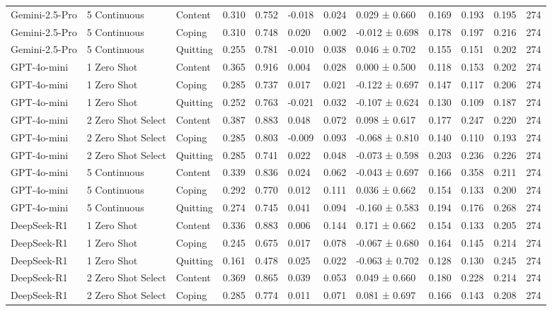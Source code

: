 \begin{tabular}{lllllllllllr}
Gemini-2.5-Pro & 5 Continuous & Content & 0.310 & 0.752 & -0.018 & 0.024 & 0.029 ± 0.660 & 0.169 & 0.193 & 0.195 & 274 \\
Gemini-2.5-Pro & 5 Continuous & Coping & 0.310 & 0.748 & 0.020 & 0.002 & -0.012 ± 0.698 & 0.178 & 0.197 & 0.216 & 274 \\
Gemini-2.5-Pro & 5 Continuous & Quitting & 0.255 & 0.781 & -0.010 & 0.038 & 0.046 ± 0.702 & 0.155 & 0.151 & 0.202 & 274 \\
GPT-4o-mini & 1 Zero Shot & Content & 0.365 & 0.916 & 0.004 & 0.028 & 0.000 ± 0.500 & 0.118 & 0.153 & 0.202 & 274 \\
GPT-4o-mini & 1 Zero Shot & Coping & 0.285 & 0.737 & 0.017 & 0.021 & -0.122 ± 0.697 & 0.147 & 0.117 & 0.206 & 274 \\
GPT-4o-mini & 1 Zero Shot & Quitting & 0.252 & 0.763 & -0.021 & 0.032 & -0.107 ± 0.624 & 0.130 & 0.109 & 0.187 & 274 \\
GPT-4o-mini & 2 Zero Shot Select & Content & 0.387 & 0.883 & 0.048 & 0.072 & 0.098 ± 0.617 & 0.177 & 0.247 & 0.220 & 274 \\
GPT-4o-mini & 2 Zero Shot Select & Coping & 0.285 & 0.803 & -0.009 & 0.093 & -0.068 ± 0.810 & 0.140 & 0.110 & 0.193 & 274 \\
GPT-4o-mini & 2 Zero Shot Select & Quitting & 0.285 & 0.741 & 0.022 & 0.048 & -0.073 ± 0.598 & 0.203 & 0.236 & 0.226 & 274 \\
GPT-4o-mini & 5 Continuous & Content & 0.339 & 0.836 & 0.024 & 0.062 & -0.043 ± 0.697 & 0.166 & 0.358 & 0.211 & 274 \\
GPT-4o-mini & 5 Continuous & Coping & 0.292 & 0.770 & 0.012 & 0.111 & 0.036 ± 0.662 & 0.154 & 0.133 & 0.200 & 274 \\
GPT-4o-mini & 5 Continuous & Quitting & 0.274 & 0.745 & 0.041 & 0.094 & -0.160 ± 0.583 & 0.194 & 0.176 & 0.268 & 274 \\
DeepSeek-R1 & 1 Zero Shot & Content & 0.336 & 0.883 & 0.006 & 0.144 & 0.171 ± 0.662 & 0.154 & 0.133 & 0.205 & 274 \\
DeepSeek-R1 & 1 Zero Shot & Coping & 0.245 & 0.675 & 0.017 & 0.078 & -0.067 ± 0.680 & 0.164 & 0.145 & 0.214 & 274 \\
DeepSeek-R1 & 1 Zero Shot & Quitting & 0.161 & 0.478 & 0.025 & 0.022 & -0.063 ± 0.702 & 0.128 & 0.130 & 0.245 & 274 \\
DeepSeek-R1 & 2 Zero Shot Select & Content & 0.369 & 0.865 & 0.039 & 0.053 & 0.049 ± 0.660 & 0.180 & 0.228 & 0.214 & 274 \\
DeepSeek-R1 & 2 Zero Shot Select & Coping & 0.285 & 0.774 & 0.011 & 0.071 & 0.081 ± 0.697 & 0.166 & 0.143 & 0.208 & 274 \\

\end{tabular}
